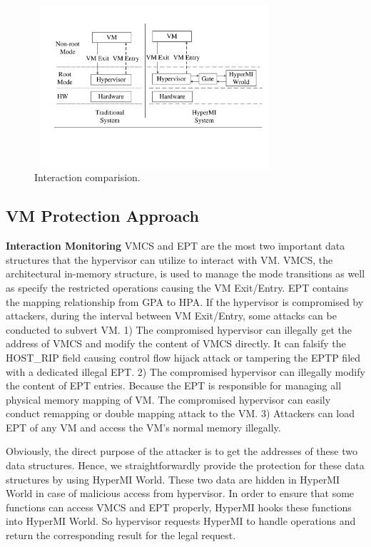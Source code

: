 \documentclass[conference]{IEEEtran}
\begin{document}
\begin{figure}
\centerline{\includegraphics[width=9cm, height=6cm]{pdfvmcsProcess.pdf}}
\caption{Interaction comparision. } \label{fig+1}
\end{figure}


\subsection{VM Protection Approach}

\textbf{Interaction Monitoring}\label {interaction}
 VMCS and EPT are the most two important data structures that the hypervisor can utilize to interact with VM. %
VMCS, the architectural in-memory structure, is used to manage the mode transitions as well as specify the restricted operations causing the VM Exit/Entry. EPT contains the mapping relationship from GPA to HPA. 
If the hypervisor is compromised by attackers, during the interval between VM Exit/Entry, some attacks can be conducted to subvert VM. 
1) The compromised hypervisor can illegally get the address of VMCS and modify the content of VMCS directly. It can falsify the HOST\_RIP field causing control flow hijack attack or tampering the EPTP filed with a dedicated illegal EPT.
2) The compromised hypervisor can illegally modify the content of EPT entries. Because the EPT is responsible for managing all physical memory mapping of VM. The compromised hypervisor can easily conduct remapping or double mapping attack to the VM.
3) Attackers can load EPT of any VM and access the VM's normal memory illegally.

Obviously, the direct purpose of the attacker is to get the addresses of these two data structures.
Hence, we straightforwardly provide the protection for these data structures by using HyperMI World. These two data are hidden in HyperMI World in case of malicious access from hypervisor. 
In order to ensure that some functions can access VMCS and EPT properly, HyperMI hooks these functions into HyperMI World. So hypervisor requests HyperMI to handle operations and return the corresponding result for the legal request. 
\end{document}
